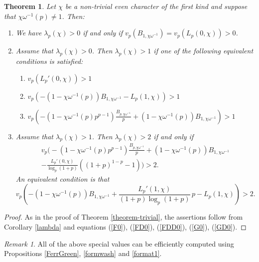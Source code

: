 \documentclass[pdflatex,sn-mathphys-num]{sn-jnl}%
\theoremstyle{plain}
\newtheorem{thm}{Theorem}[section]
\theoremstyle{definition}
\theoremstyle{remark}
\newtheorem*{rem*}{Remark}
\numberwithin{equation}{section}
\begin{document}
\begin{thm} Let $\chi$ be a non-trivial even character of the first kind and suppose that $\chi \omega^{-1} (p) \neq 1 $. Then:
\begin{enumerate}
\item[(i)] We have $\lambda_p(\chi) > 0$ if and only if $v_p(B_{1,\chi \omega^{-1}}) = v_p (L_p(0,\chi) ) > 0$.
\item[(ii)] Assume that $\lambda_p(\chi) > 0$. Then $\lambda_p(\chi) > 1$ if one of the following equivalent conditions is satisfied:
\begin{enumerate}
\item[(a)]  $v_p (L_p'(0,\chi)) > 1$
\item[(b)] $ v_p (- (1-\chi\omega^{-1}(p)) B_{1,\chi \omega^{-1}} - L_p(1,\chi)  ) > 1  $
\item[(c)] $ v_p \left( -( 1- \chi \omega^{-1}(p) p^{p-1} )  \frac{B_{p, \chi \omega^{-1}}} {p} + (1-\chi\omega^{-1}(p)) B_{1,\chi \omega^{-1}} \right) > 1  $
\end{enumerate}

\item[(iii)] Assume that $\lambda_p(\chi) > 1$. 
Then $\lambda_p(\chi) > 2$ if and only if 
$$
\begin{multlined}
 v_p \bigg( - \left( 1- \chi \omega^{-1}(p) p^{p-1} \right)  \frac{B_{p, \chi \omega^{-1}}} {p}  + \left(1- \chi \omega^{-1}(p) \right) B_{1, \chi \omega^{-1}} \\
 -  \frac{ L_p'(0,\chi)}{\log_p(1+p)} \left( (1+p)^{1-p} -1 \right) \bigg) > 2.
 \end{multlined}
 $$
 An equivalent condition is that
$$ v_p \left( - (1-\chi\omega^{-1}(p)) B_{1,\chi \omega^{-1}} + \frac{ L_p'(1,\chi)} { (1+p) \log_p ( 1+p) }\, p - L_p(1,\chi) \right) > 2 . $$


\end{enumerate}
\label{theorem-general}
\end{thm}


\begin{proof}
As in the proof of Theorem \ref{theorem-trivial}, the assertions follow from Corollary \ref{lambda} and equations (\ref{F0}), (\ref{FD0}), (\ref{FDD0}), (\ref{G0}), (\ref{GD0}). 
\end{proof}

\begin{rem*} All of the above special values can be efficiently computed using Propositions \ref{FerrGreen}, \ref{formwash} and \ref{format1}.
\end{rem*}
\end{document}
